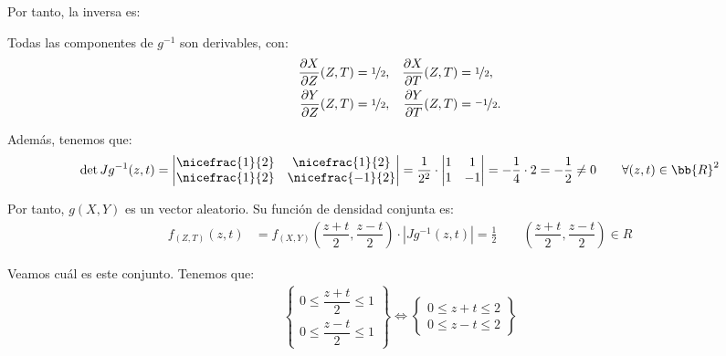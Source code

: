 \documentclass[12pt]{article}
\begin{document}
\begin{ejercicio}
\begin{enumerate}
            Por tanto, la inversa es:

            Todas las componentes de $g^{-1}$ son derivables, con:
            \begin{align*}
                \dfrac{\partial X}{\partial Z}(Z,T)&=\nicefrac{1}{2}, & \dfrac{\partial X}{\partial T}(Z,T)&=\nicefrac{1}{2},\\
                \dfrac{\partial Y}{\partial Z}(Z,T)&=\nicefrac{1}{2}, & \dfrac{\partial Y}{\partial T}(Z,T)&=\nicefrac{-1}{2}.
            \end{align*}

            Además, tenemos que:
            \begin{equation*}
                \det Jg^{-1}(z,t) = \begin{vmatrix}
                    \nicefrac{1}{2} & \nicefrac{1}{2}\\
                    \nicefrac{1}{2} & \nicefrac{-1}{2}
                \end{vmatrix}
                = \dfrac{1}{2^2}\cdot \begin{vmatrix}
                    1 & 1\\
                    1 & -1
                \end{vmatrix} = -\dfrac{1}{4}\cdot 2 = -\frac{1}{2}\neq 0\qquad \forall (z,t)\in \bb{R}^2
            \end{equation*}

            Por tanto, $g(X,Y)$ es un vector aleatorio. Su función de densidad conjunta es:
            \begin{align*}
                f_{(Z,T)}(z,t) &= f_{(X,Y)}\left(\dfrac{z+t}{2},\dfrac{z-t}{2}\right) \cdot |Jg^{-1}(z,t)| = \frac{1}{2}\qquad \left(\dfrac{z+t}{2},\dfrac{z-t}{2}\right)\in R
            \end{align*}

            Veamos cuál es este conjunto. Tenemos que:
            \begin{align*}
                \left\{
                    \begin{array}{l}
                        0\leq \dfrac{z+t}{2}\leq 1\\
                        0\leq \dfrac{z-t}{2}\leq 1
                    \end{array}
                \right\}
                \Longleftrightarrow
                \left\{
                    \begin{array}{l}
                        0\leq z+t\leq 2\\
                        0\leq z-t\leq 2
                    \end{array}
                \right\}
            \end{align*}


\end{enumerate}
\end{ejercicio}
\end{document}
